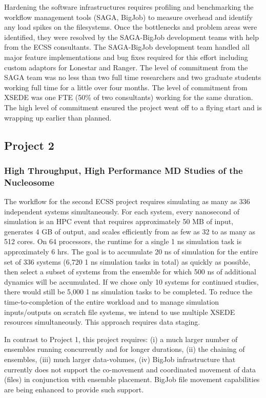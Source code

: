 \documentclass{sig-alternate}
\begin{document}
Hardening the software infrastructures requires profiling and benchmarking the
workflow management tools (SAGA, BigJob) to measure overhead and identify any
load spikes on the filesystems. Once the bottlenecks and problem areas were
identified, they were resolved by the SAGA-BigJob development teams with help
from the ECSS consultants. The SAGA-BigJob development team handled all major
feature implementations and bug fixes required for this effort including custom
adaptors for Lonestar and Ranger. The level of commitment from the SAGA team
was no less than two full time researchers and two graduate students working
full time for a little over four months. The level of commitment from XSEDE was
one FTE (50\% of two consultants) working for the same duration. The high level
of commitment ensured the project went off to a flying start and is wrapping up
earlier than planned.

\subsection{Project 2}
\subsubsection*{High Throughput, High Performance MD Studies of the
  Nucleosome}

The workflow for the second ECSS project requires simulating as many as 336
independent systems simultaneously. For each system, every nanosecond of
simulation is an HPC event that requires approximately 50 MB of input, generates
4 GB of output, and scales efficiently from as few as 32 to as many as 512 cores.
On 64 processors, the runtime for a single 1 ns simulation task is approximately
6 hrs. The goal is to accumulate 20 ns of simulation for the entire set of 336
systems (6,720 1 ns simulation tasks in total) as quickly as possible, then
select a subset of systems from the ensemble for which 500 ns of additional
dynamics will be accumulated. If we chose only 10 systems for continued studies,
there would still be 5,000 1 ns simulation tasks to be completed. To reduce the
time-to-completion of the entire workload and to manage simulation
inputs/outputs on scratch file systems, we intend to use multiple XSEDE
resources simultaneously. This approach requires data staging.

In contrast to Project 1, this project requires: 
(i) a much larger number of ensembles
running concurrently and for longer durations, (ii) the chaining of
ensembles, (iii) much larger data-volumes, (iv) BigJob infrastructure that currently does not support the
co-movement and coordinated movement of data (files) in conjunction
with ensemble placement. BigJob file movement capabilities are being
enhanced to provide such support.
\end{document}
